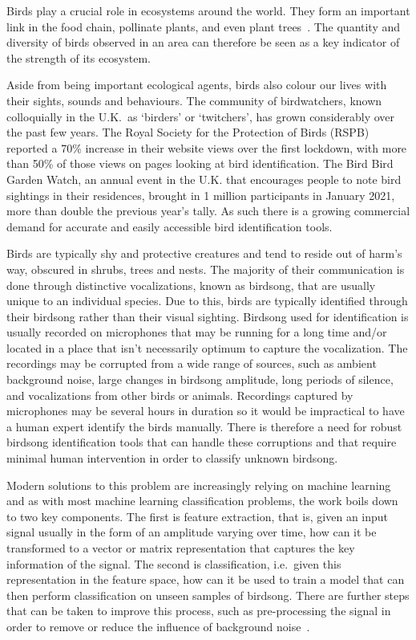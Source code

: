 Birds play a crucial role in ecosystems around the world. They form an important
link in the food chain, pollinate plants, and even plant
trees~\cite{broughton2021long}. The quantity and diversity of birds observed in
an area can therefore be seen as a key indicator of the strength of its
ecosystem.

Aside from being important ecological agents, birds also colour our lives with
their sights, sounds and behaviours. The community of birdwatchers, known
colloquially in the U.K.~as `birders' or `twitchers', has grown considerably
over the past few years. The Royal Society for the Protection of Birds (RSPB)
reported a 70\% increase in their website views over the first lockdown, with
more than 50\% of those views on pages looking at bird identification. The Bird
Bird Garden Watch, an annual event in the U.K. that encourages people to note
bird sightings in their residences, brought in 1 million participants in January
2021, more than double the previous year's tally. As such there is a growing
commercial demand for accurate and easily accessible bird identification tools.

Birds are typically shy and protective creatures and tend to reside out of
harm's way, obscured in shrubs, trees and nests. The majority of their
communication is done through distinctive vocalizations, known as birdsong, that
are usually unique to an individual species. Due to this, birds are typically
identified through their birdsong rather than their visual sighting. Birdsong
used for identification is usually recorded on microphones that may be running
for a long time and/or located in a place that isn't necessarily optimum to
capture the vocalization. The recordings may be corrupted from a wide range of
sources, such as ambient background noise, large changes in birdsong amplitude,
long periods of silence, and vocalizations from other birds or animals.
Recordings captured by microphones may be several hours in duration so it would
be impractical to have a human expert identify the birds manually. There is
therefore a need for robust birdsong identification tools that can handle these
corruptions and that require minimal human intervention in order to classify
unknown birdsong. 

Modern solutions to this problem are increasingly relying on machine learning
and as with most machine learning classification problems, the work boils down
to two key components. The first is feature extraction, that is, given an input
signal usually in the form of an amplitude varying over time, how can it be
transformed to a vector or matrix representation that captures the key
information of the signal. The second is classification, i.e.~given this
representation in the feature space, how can it be used to train a model that
can then perform classification on unseen samples of birdsong. There are further
steps that can be taken to improve this process, such as pre-processing the
signal in order to remove or reduce the influence of background
noise~\cite{potamitis2014automatic}.

